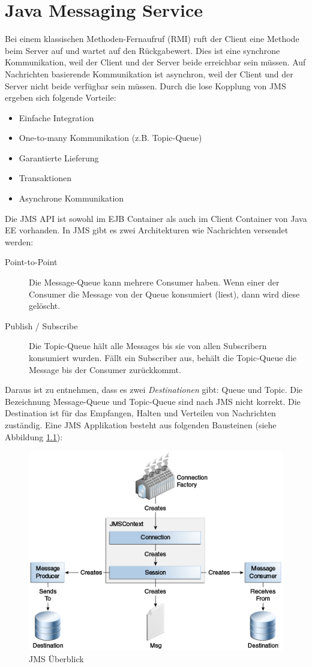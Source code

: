 \chapter{Java Messaging Service}

Bei einem klassischen Methoden-Fernaufruf (RMI) ruft der Client eine Methode beim Server auf und wartet auf den Rückgabewert. Dies ist eine synchrone Kommunikation, weil der Client und der Server beide erreichbar sein müssen. Auf Nachrichten basierende Kommunikation ist asynchron, weil der Client und der Server nicht beide verfügbar sein müssen. Durch die lose Kopplung von JMS ergeben sich folgende Vorteile:

\begin{itemize}
	\item Einfache Integration
	\item One-to-many Kommunikation (z.B. Topic-Queue)
	\item Garantierte Lieferung
	\item Transaktionen
	\item Asynchrone Kommunikation
\end{itemize}

Die JMS API ist sowohl im EJB Container als auch im Client Container von Java EE vorhanden. In JMS gibt es zwei Architekturen wie Nachrichten versendet werden:

\begin{description}
	\item[Point-to-Point] Die Message-Queue kann mehrere Consumer haben. Wenn einer der Consumer die Message von der Queue konsumiert (liest), dann wird diese gelöscht.
	\item[Publish / Subscribe] Die Topic-Queue hält alle Messages bis sie von allen Subscribern konsumiert wurden. Fällt ein Subscriber aus, behält die Topic-Queue die Message bis der Consumer zurückkommt.
\end{description}

Daraus ist zu entnehmen, dass es zwei \emph{Destinationen} gibt: Queue und Topic. Die Bezeichnung Message-Queue und Topic-Queue sind nach JMS nicht korrekt. Die Destination ist für das Empfangen, Halten und Verteilen von Nachrichten zuständig. Eine JMS Applikation besteht aus folgenden Bausteinen (siehe Abbildung \ref{fig:jms-overview}):

\begin{figure}
\centering
\includegraphics[width=0.43\linewidth]{fig/jms-overview}
\caption{JMS Überblick}
\label{fig:jms-overview}
\end{figure}




